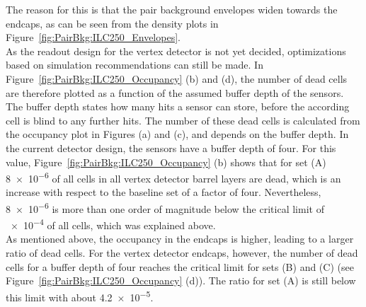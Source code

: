 The reason for this is that the pair background envelopes widen towards the endcaps, as can be seen from the density plots in Figure~\ref{fig:PairBkg:ILC250_Envelopes}.
\\As the readout design for the vertex detector is not yet decided, optimizations based on simulation recommendations can still be made.
In Figure~\ref{fig:PairBkg:ILC250_Occupancy} (b) and (d), the number of dead cells are therefore plotted as a function of the assumed buffer depth of the sensors.
The buffer depth states how many hits a sensor can store, before the according cell is blind to any further hits.
The number of these dead cells is calculated from the occupancy plot in Figures (a) and (c), and depends on the buffer depth.
In the current detector design, the sensors have a buffer depth of four. 
For this value, Figure~\ref{fig:PairBkg:ILC250_Occupancy} (b) shows that for set (A) \num{8e-6} of all cells in all vertex detector barrel layers are dead, which is an increase with respect to the baseline set of a factor of four.
Nevertheless, \num{8e-6} is more than one order of magnitude below the critical limit of \num{e-4} of all cells, which was explained above.
\\As mentioned above, the occupancy in the endcaps is higher, leading to a larger ratio of dead cells.
For the vertex detector endcaps, however, the number of dead cells for a buffer depth of four reaches the critical limit for sets (B) and (C) (see Figure~\ref{fig:PairBkg:ILC250_Occupancy} (d)).
The ratio for set (A) is still below this limit with about \num{4.2e-5}.\\
